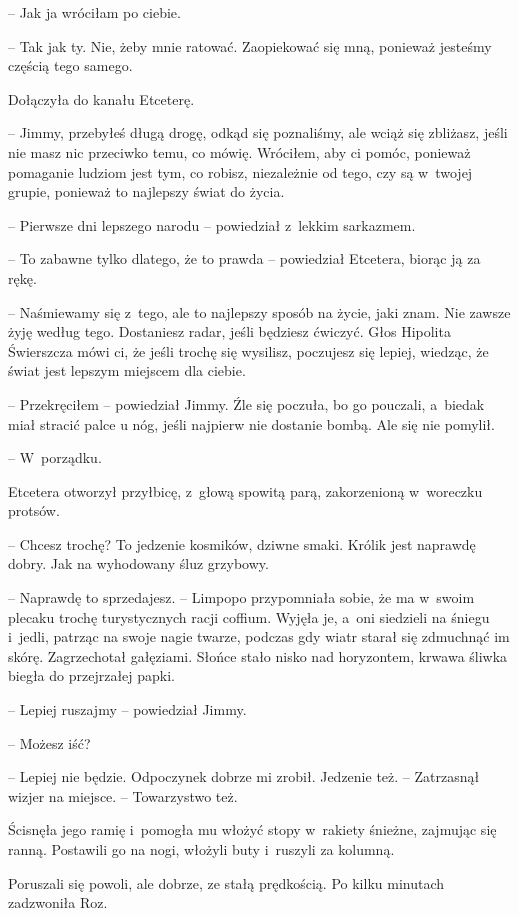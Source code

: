 \documentclass[oneside,polish,11pt,sfheadings]{mwbk}
\begin{document}
-- Jak ja wróciłam po ciebie.

-- Tak jak ty. Nie, żeby mnie ratować. Zaopiekować się mną, ponieważ
jesteśmy częścią tego samego.

Dołączyła do kanału Etceterę. 

-- Jimmy, przebyłeś długą drogę, odkąd się
poznaliśmy, ale wciąż się zbliżasz, jeśli nie masz nic przeciwko temu,
co mówię. Wróciłem, aby ci pomóc, ponieważ pomaganie ludziom jest tym,
co robisz, niezależnie od tego, czy są w~twojej grupie, ponieważ to
najlepszy świat do życia.

-- Pierwsze dni lepszego narodu -- powiedział z~lekkim sarkazmem.

-- To zabawne tylko dlatego, że to prawda -- powiedział Etcetera, biorąc
ją za rękę.

-- Naśmiewamy się z~tego, ale to najlepszy sposób na życie, jaki znam.
Nie zawsze żyję według tego. Dostaniesz radar, jeśli będziesz ćwiczyć.
Głos Hipolita Świerszcza mówi ci, że jeśli trochę się wysilisz,
poczujesz się lepiej, wiedząc, że świat jest lepszym miejscem dla
ciebie.

-- Przekręciłem -- powiedział Jimmy. Źle się poczuła, bo go pouczali, a~biedak miał stracić palce u nóg, jeśli najpierw nie dostanie bombą. Ale
się nie pomylił.

-- W~porządku.

Etcetera otworzył przyłbicę, z~głową spowitą parą, zakorzenioną w~woreczku protsów. 

-- Chcesz trochę? To jedzenie kosmików, dziwne smaki.
Królik jest naprawdę dobry. Jak na wyhodowany śluz grzybowy.

-- Naprawdę to sprzedajesz. -- Limpopo przypomniała sobie, że ma w~swoim
plecaku trochę turystycznych racji coffium. Wyjęła je, a~oni siedzieli
na śniegu i~jedli, patrząc na swoje nagie twarze, podczas gdy wiatr
starał się zdmuchnąć im skórę. Zagrzechotał gałęziami. Słońce stało
nisko nad horyzontem, krwawa śliwka biegła do przejrzałej papki.

-- Lepiej ruszajmy -- powiedział Jimmy.

-- Możesz iść?

-- Lepiej nie będzie. Odpoczynek dobrze mi zrobił. Jedzenie też. -- Zatrzasnął wizjer na miejsce. -- Towarzystwo też.

Ścisnęła jego ramię i~pomogła mu włożyć stopy w~rakiety śnieżne,
zajmując się ranną. Postawili go na nogi, włożyli buty i~ruszyli za
kolumną.

Poruszali się powoli, ale dobrze, ze stałą prędkością. Po kilku minutach
zadzwoniła Roz. 
\end{document}
